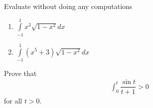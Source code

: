 \documentclass[9pt, a4paper, oneside]{amsart}
\begin{document}
\begin{questions}
	\item Evaluate without doing any computations
	\begin{enumerate}
		\item $ \int \limits_{-1}^{1} x^3 \sqrt{1 - x^2} dx$
		\item $ \int \limits_{-1}^{1} (x^5 + 3)\sqrt{1 - x^2} dx$
	\end{enumerate}

	\item Prove that
	\begin{align*}
		\int_{0}^t \dfrac{\sin t}{t+1} > 0
	\end{align*}
	for all $ t > 0$.
\end{questions}









\newpage
\end{document}
